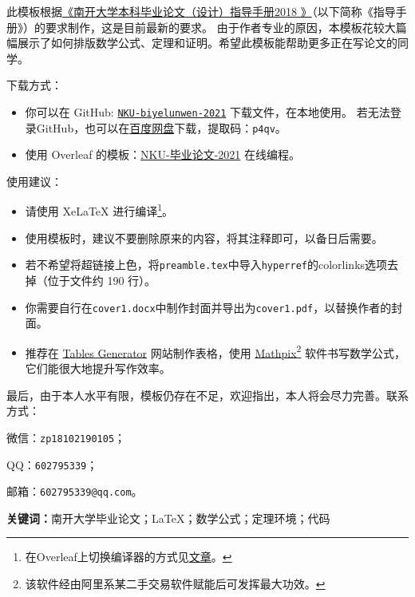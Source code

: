 \documentclass[zihao = -4, linespread = 1.5]{ctexart}
\begin{document}
\NKUInputCover %


\begin{NKUAbstractZh}
此模板根据\href{http://jwc.nankai.edu.cn/bylwwsjw/list.htm}{《南开大学本科毕业论文（设计）指导手册2018 》}（以下简称《指导手册》）的要求制作，这是目前最新的要求。
由于作者专业的原因，本模板花较大篇幅展示了如何排版数学公式、定理和证明。希望此模板能帮助更多正在写论文的同学。

{\heiti 下载方式：}
\begin{itemize}
  \item 你可以在 GitHub: \href{https://github.com/skyline77/NKU-biyelunwen-2021}{\texttt{NKU-biyelunwen-2021}} 下载文件，在本地使用。
            若无法登录GitHub，也可以在\href{https://pan.baidu.com/s/1RnDI7RqW5qRcyaw8ZpYMTw}{百度网盘}下载，提取码：\texttt{p4qv}。
  \item 使用 Overleaf 的模板：\href{https://www.overleaf.com/latex/templates/nku-bi-ye-lun-wen-2021/svxybkzxyycp}{NKU-毕业论文-2021} 在线编程。
\end{itemize}

{\heiti 使用建议：}
\begin{itemize}
  \item 请使用 XeLaTeX 进行编译\footnote{在Overleaf上切换编译器的方式见\href{https://www.overleaf.com/learn/how-to/Changing_compiler}{文章}。}。
  \item 使用模板时，建议不要删除原来的内容，将其注释即可，以备日后需要。
  \item 若不希望将超链接上色，将\texttt{preamble.tex}中导入\texttt{hyperref}的colorlinks选项去掉（位于文件约 190 行）。
  \item 你需要自行在\texttt{cover1.docx}中制作封面并导出为\texttt{cover1.pdf}，以替换作者的封面。
  \item 推荐在 \href{https://www.tablesgenerator.com/}{Tables Generator} 网站制作表格，使用 \href{https://mathpix.com/ocr/}{Mathpix}\footnote{该软件经由阿里系某二手交易软件赋能后可发挥最大功效。} 软件书写数学公式，它们能很大地提升写作效率。
\end{itemize}

最后，由于本人水平有限，模板仍存在不足，欢迎指出，本人将会尽力完善。联系方式：
\begin{enumerate*}[label=(\arabic*)]
   \item 微信：\texttt{zp18102190105}；
  \item QQ：\texttt{602795339}；
  \item 邮箱：\texttt{602795339@qq.com}。
\end{enumerate*}
\par\noindent\textbf{关键词：}南开大学毕业论文；\LaTeX；数学公式；定理环境；代码
\end{NKUAbstractZh}
\end{document}
